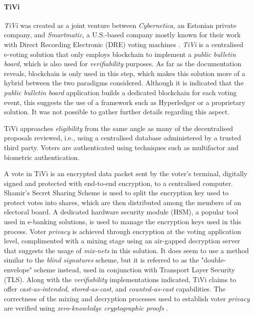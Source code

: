 \documentclass[../access.tex]{subfiles}
\begin{document}
\paragraph{TiVi \cite{TiVi2021}}
\textit{TiVi} was created as a joint venture between \textit{Cybernetica}, an Estonian private company, and \textit{Smartmatic}, a U.S.-based company mostly known for their work with Direct Recording Electronic (DRE) voting machines \cite{Tivi2021a}. \textit{TiVi} is a centralised e-voting solution that only employs blockchain to implement a \textit{public bulletin board}, which is also used for \textit{verifiability} purposes. As far as the documentation reveals, blockchain is only used in this step, which makes this solution more of a hybrid between the two paradigms considered. Although it is indicated that the \textit{public bulletin board} application builds a dedicated blockchain for each voting event, this suggests the use of a framework such as Hyperledger or a proprietary solution. It was not possible to gather further details regarding this aspect.
\par
TiVi approaches \textit{eligibility} from the same angle as many of the decentralised proposals reviewed, i.e., using a centralised database administered by a trusted third party. Voters are authenticated using techniques such as multifactor and biometric authentication.
\par
A vote in TiVi is an encrypted data packet sent by the voter's terminal, digitally signed and protected with end-to-end encryption, to a centralised computer. Shamir's Secret Sharing Scheme \cite{Shamir1979} is used to split the encryption key used to protect votes into shares, which are then distributed among the members of an electoral board. A dedicated hardware security module (HSM), a popular tool used in e-banking solutions, is used to manage the encryption keys used in this process. Voter \textit{privacy} is achieved through encryption at the voting application level, complimented with a mixing stage using an air-gapped decryption server that suggests the usage of \textit{mix-nets} in this solution. It does seem to use a method similar to the \textit{blind signatures} scheme, but it is referred to as the "double-envelope" scheme instead, used in conjunction with Transport Layer Security (TLS). Along with the \textit{verifiability} implementations indicated, TiVi claims to offer \textit{cast-as-intended}, \textit{stored-as-cast}, and \textit{counted-as-cast} capabilities. The correctness of the mixing and decryption processes used to establish voter \textit{privacy} are verified using \textit{zero-knowledge cryptographic proofs} \cite{Tivi2021c}.
\end{document}
